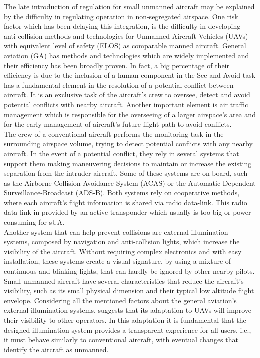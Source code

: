 The late introduction of regulation for small unmanned aircraft may be explained by the difficulty in regulating operation in non-segregated airspace. One risk factor which has been delaying this integration, is the difficulty in developing anti-collision methods and technologies for Unmanned Aircraft Vehicles (UAVs) with equivalent level of safety (ELOS) as comparable manned aircraft. General aviation (GA) has methods and technologies which are widely implemented and their efficiency has been broadly proven. In fact, a big percentage of their efficiency is due to the inclusion of a human component in the See and Avoid task has a fundamental element in the resolution of a potential conflict between aircraft. It is an exclusive task of the aircraft's crew to oversee, detect and avoid potential conflicts with nearby aircraft. Another important element is air traffic management which is responsible for the overseeing of a larger airspace's area and for the early management of aircraft's future flight path to avoid conflicts.\\
The crew of a conventional aircraft performs the monitoring task in the surrounding airspace volume, trying to detect potential conflicts with any nearby aircraft. In the event of a potential conflict, they rely in several systems that support them making maneuvering decisions to maintain or increase the existing separation from the intruder aircraft. Some of these systems are on-board, such as the Airborne Collision Avoidance System (ACAS) or the Automatic Dependent Surveillance-Broadcast (ADS-B). Both systems rely on cooperative methods, where each aircraft's flight information is shared via radio data-link. This radio data-link in provided by an active transponder which usually is too big or power consuming for sUA.\\
Another system that can help prevent collisions are external illumination systems, composed by navigation and anti-collision lights, which increase the visibility of the aircraft. Without requiring complex electronics and with easy installation, these systems create a visual signature, by using a mixture of continuous and blinking lights, that can hardly be ignored by other nearby pilots.\\
Small unmanned aircraft have several characteristics that reduce the aircraft's visibility, such as its small physical dimension and their typical low altitude flight envelope. Considering all the mentioned factors about the general aviation's external illumination systems, suggests that its adaptation to UAVs will improve their visibility to other operators. In this adaptation it is fundamental that the designed illumination system provides a transparent experience for all users, i.e., it must behave similarly to conventional aircraft, with eventual changes that identify the aircraft as unmanned.\\

